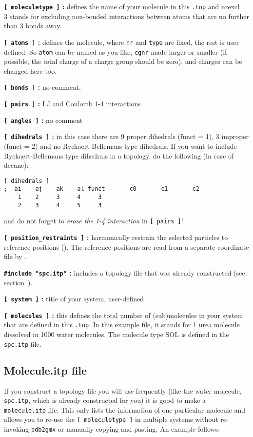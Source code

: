 {\bf {\tt [~moleculetype~]} :} defines the name of your molecule in
this {\tt *.top} and nrexcl = 3 stands for excluding non-bonded
interactions between atoms that are no further than 3 bonds away.

{\bf {\tt [~atoms~]} :} defines the molecule, where {\tt nr} and
{\tt type} are fixed, the rest is user defined. So {\tt atom} can be named
as you like, {\tt cgnr} made larger or smaller (if possible, the total
charge of a charge group should be zero), and charges can be changed
here too.

{\bf {\tt [~bonds~]} :} no comment.

{\bf {\tt [~pairs~]} :} LJ and Coulomb 1-4 interactions

{\bf {\tt [~angles~]} :} no comment

{\bf {\tt [~dihedrals~]} :} in this case there are 9 proper dihedrals
(funct = 1), 3 improper (funct = 2) and no Ryckaert-Bellemans type
dihedrals. If you want to include Ryckaert-Bellemans type dihedrals
in a topology, do the following (in case of {\eg} decane):
\begin{verbatim}
[ dihedrals ]
;  ai    aj    ak    al funct       c0       c1       c2
    1    2     3     4     3 
    2    3     4     5     3
\end{verbatim}
and do not forget to {\em erase the 1-4 interaction} 
in {\tt [~pairs~]}!

{\bf {\tt [~position_restraints~]} :} harmonically restrain the selected particles
to reference positions (). 
The reference positions are read from a 
separate coordinate file by .

{\bf {\tt \#include "spc.itp"} :} includes a topology file that was already
constructed (see section~).

{\bf {\tt [~system~]} :} title of your system, user-defined

{\bf {\tt [~molecules~]} :} this defines the total number of (sub)molecules
in your system that are defined in this {\tt *.top}. In this
example file, it stands for 1 urea molecule dissolved in 1000 water
molecules. The molecule type SOL is defined in the {\tt spc.itp} file.

\subsection{Molecule.itp file}
\label{subsec:molitp}
If you construct a topology file you will use frequently (like the water
molecule, {\tt spc.itp}, which is already constructed for you) it is
good to make a {\tt molecule.itp} file. This only lists the
information of one particular molecule and allows you to re-use the
{\tt [ moleculetype ]} in multiple systems without re-invoking
{\tt pdb2gmx} or manually copying and pasting. An example follows: 


